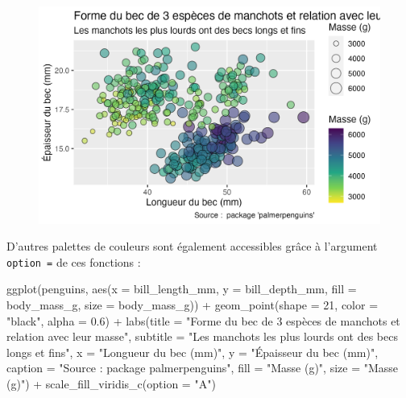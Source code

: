 \documentclass[
  letterpaper,
  DIV=11,
  numbers=noendperiod]{scrreprt}
\newenvironment{Shaded}{\begin{snugshade}}{\end{snugshade}}
\newcommand{\AttributeTok}[1]{\textcolor[rgb]{0.40,0.45,0.13}{#1}}
\newcommand{\DecValTok}[1]{\textcolor[rgb]{0.68,0.00,0.00}{#1}}
\newcommand{\FloatTok}[1]{\textcolor[rgb]{0.68,0.00,0.00}{#1}}
\newcommand{\FunctionTok}[1]{\textcolor[rgb]{0.28,0.35,0.67}{#1}}
\newcommand{\NormalTok}[1]{\textcolor[rgb]{0.00,0.23,0.31}{#1}}
\newcommand{\SpecialCharTok}[1]{\textcolor[rgb]{0.37,0.37,0.37}{#1}}
\newcommand{\StringTok}[1]{\textcolor[rgb]{0.13,0.47,0.30}{#1}}
\begin{document}
\begin{figure}[H]

{\centering \includegraphics{./03-visualization_files/figure-pdf/unnamed-chunk-91-1.png}

}

\end{figure}

D'autres palettes de couleurs sont également accessibles grâce à
l'argument \texttt{option\ =} de ces fonctions :

\begin{Shaded}
\begin{Highlighting}[]
\FunctionTok{ggplot}\NormalTok{(penguins, }\FunctionTok{aes}\NormalTok{(}\AttributeTok{x =}\NormalTok{ bill\_length\_mm, }\AttributeTok{y =}\NormalTok{ bill\_depth\_mm,}
                     \AttributeTok{fill =}\NormalTok{ body\_mass\_g, }\AttributeTok{size =}\NormalTok{ body\_mass\_g)) }\SpecialCharTok{+}
  \FunctionTok{geom\_point}\NormalTok{(}\AttributeTok{shape =} \DecValTok{21}\NormalTok{, }\AttributeTok{color =} \StringTok{"black"}\NormalTok{, }\AttributeTok{alpha =} \FloatTok{0.6}\NormalTok{) }\SpecialCharTok{+}
  \FunctionTok{labs}\NormalTok{(}\AttributeTok{title =} \StringTok{"Forme du bec de 3 espèces de manchots et relation avec leur masse"}\NormalTok{,}
       \AttributeTok{subtitle =} \StringTok{"Les manchots les plus lourds ont des becs longs et fins"}\NormalTok{,}
       \AttributeTok{x =} \StringTok{"Longueur du bec (mm)"}\NormalTok{,}
       \AttributeTok{y =} \StringTok{"Épaisseur du bec (mm)"}\NormalTok{,}
       \AttributeTok{caption =} \StringTok{"Source :  package \textquotesingle{}palmerpenguins\textquotesingle{}"}\NormalTok{,}
       \AttributeTok{fill =} \StringTok{"Masse (g)"}\NormalTok{,}
       \AttributeTok{size =} \StringTok{"Masse (g)"}\NormalTok{) }\SpecialCharTok{+}
  \FunctionTok{scale\_fill\_viridis\_c}\NormalTok{(}\AttributeTok{option =} \StringTok{"A"}\NormalTok{)}
\end{Highlighting}
\end{Shaded}
\end{document}
